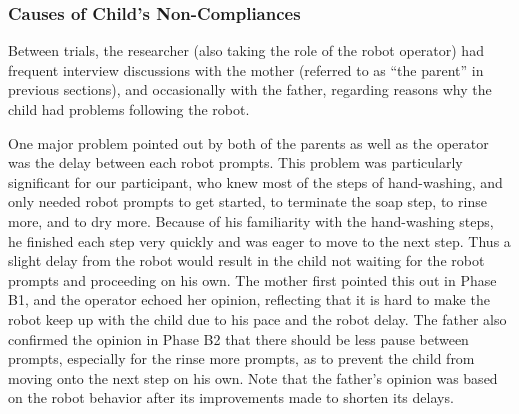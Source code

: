\documentclass{ut-thesis}
\begin{document}

\subsubsection{Causes of Child's Non-Compliances}
Between trials, the researcher (also taking the role of the robot operator) had frequent interview discussions with the mother (referred to as ``the parent'' in previous sections), and occasionally with the father, regarding reasons why the child had problems following the robot.

One major problem pointed out by both of the parents as well as the operator was the delay between each robot prompts.  This problem was particularly significant for our participant, who knew most of the steps of hand-washing, and only needed robot prompts to get started, to terminate the soap step, to rinse more, and to dry more.  Because of his familiarity with the hand-washing steps, he finished each step very quickly and was eager to move to the next step.  Thus a slight delay from the robot would result in the child not waiting for the robot prompts and proceeding on his own.  The mother first pointed this out in Phase B1, and the operator echoed her opinion, reflecting that it is hard to make the robot keep up with the child due to his pace and the robot delay.  The father also confirmed the opinion in Phase B2 that there should be less pause between prompts, especially for the rinse more prompts, as to prevent the child from moving onto the next step on his own.  Note that the father's opinion was based on the robot behavior after its improvements made to shorten its delays.
\end{document}
